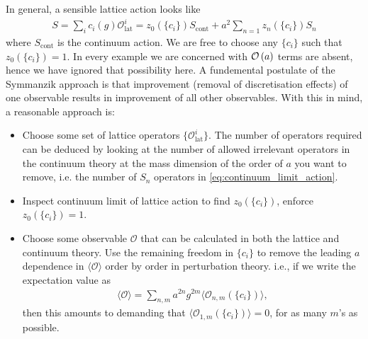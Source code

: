 In general, a sensible lattice action looks like
\begin{align}
  S = \sum_{i} c_i(g) \mathcal{O}^i_{\text{lat}} = z_0(\{c_i\}) S_{\text{cont}} + a^2 \sum_{n=1} z_n(\{c_i\}) S_n
  \label{eq:continuum_limit_action}
\end{align}
where $S_{\text{cont}}$ is the continuum action. We are free to choose any $\{c_i\}$ such that $z_0(\{c_i\}) = 1$. In every example we are concerned with $\mathcal{O}\left( a \right)$ terms are absent, hence we have ignored that possibility here. A fundemental postulate of the Symmanzik approach is that improvement (removal of discretisation effects) of one observable results in improvement of all other observables. With this in mind, a reasonable approach is:
\begin{itemize}
\item
  Choose some set of lattice operators $\{\mathcal{O}^i_{\text{lat}}\}$. The number of operators required can be deduced by looking at the number of allowed irrelevant operators in the continuum theory at the mass dimension of the order of $a$ you want to remove, i.e. the number of $S_n$ operators in \eqref{eq:continuum_limit_action}.
\item
  Inspect continuum limit of lattice action to find $z_0(\{c_i\})$, enforce $z_0(\{c_i\})=1$.
\item
  Choose some observable $\mathcal{O}$ that can be calculated in both the lattice and continuum theory. Use the remaining freedom in $\{c_i\}$ to remove the leading $a$ dependence in $\langle \mathcal{O}\rangle$ order by order in perturbation theory. i.e., if we write the expectation value as
  \begin{align}
    \langle \mathcal{O} \rangle = \sum_{n,m} a^{2n} g^{2m}\langle \mathcal{O}_{n,m}(\{c_i\}) \rangle,
  \end{align}
then this amounts to demanding that $\langle \mathcal{O}_{1,m}(\{c_i\})\rangle = 0$, for as many $m$'s as possible.
\end{itemize}

